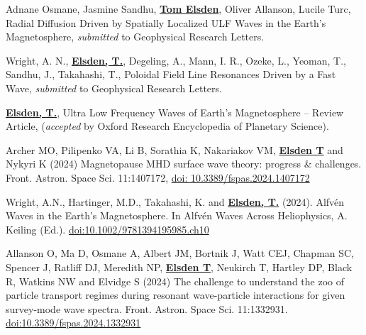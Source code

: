 \documentclass[11pt,a4paper]{article} %
\newcommand\vs{\vspace{-0.25cm}}
\begin{document}
\begin{etaremune}	%

\vspace{-0.5cm}
\vs
\item Adnane Osmane, Jasmine Sandhu, \underline{\textbf{Tom Elsden}}, Oliver Allanson, Lucile Turc, Radial Diffusion Driven by Spatially Localized ULF Waves in the Earth's Magnetosphere, \textit{submitted} to Geophysical Research Letters.

\vs
\item
Wright, A. N., \underline{\textbf{Elsden, T.}}, Degeling, A., Mann, I. R., Ozeke, L., Yeoman, T., Sandhu, J., Takahashi, T., Poloidal Field Line Resonances Driven by a Fast Wave, \textit{submitted} to Geophysical Research Letters.

\vs
\item \underline{\textbf{Elsden, T.}}, Ultra Low Frequency Waves of Earth's Magnetosphere – Review Article, (\textit{accepted} by Oxford Research Encyclopedia of Planetary Science).

\vspace{-0.5cm}

\vs
\item Archer MO, Pilipenko VA, Li B, Sorathia K, Nakariakov VM, \underline{\textbf{Elsden T}} and Nykyri K (2024) Magnetopause MHD surface wave theory: progress \& challenges. Front. Astron. Space Sci. 11:1407172, \href{https://doi.org/10.3389/fspas.2024.1407172}{doi: 10.3389/fspas.2024.1407172}
\vs

\item Wright, A.N., Hartinger, M.D., Takahashi, K. and  \underline{\textbf{Elsden, T.}} (2024). Alfvén Waves in the Earth's Magnetosphere. In Alfvén Waves Across Heliophysics, A. Keiling (Ed.).
\newline 
\href{https://doi.org/10.1002/9781394195985.ch10}{doi:10.1002/9781394195985.ch10}
\vs 

\item Allanson O, Ma D, Osmane A, Albert JM, Bortnik J, Watt CEJ, Chapman SC, Spencer J, Ratliff DJ, Meredith NP, \underline{\textbf{Elsden T}}, Neukirch T, Hartley DP, Black R, Watkins NW and Elvidge S (2024) The challenge to understand the zoo of particle transport regimes during resonant wave-particle interactions for given survey-mode wave spectra. Front. Astron. Space Sci. 11:1332931. 
\newline \href{https://doi.org/10.3389/fspas.2024.1332931}{doi:10.3389/fspas.2024.1332931}


\end{etaremune}
\end{document}
